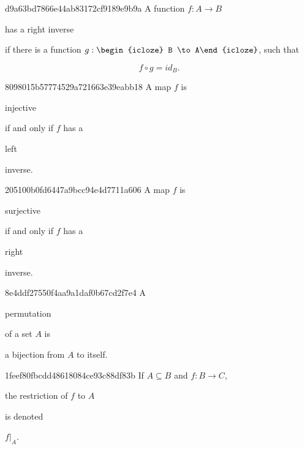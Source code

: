 \begin{note}{d9a63bd7866e44ab83172cf9189e9b9a}
    A function \({ f : A \to B }\) \begin{icloze}{3}has a right inverse\end{icloze} if there is a function \({ g : \begin{icloze}{2}B \to A\end{icloze} }\), such that
    \begin{icloze}{1}
        \[
            f \circ g = id_B.
        \]
    \end{icloze}
\end{note}

\begin{note}{8098015b57774529a721663e39eabb18}
    A map \({ f }\) is \begin{icloze}{1}injective\end{icloze} if and only if \({ f }\) has a \begin{icloze}{2}left\end{icloze} inverse.
\end{note}

\begin{note}{205100b0fd6447a9bcc94e4d7711a606}
    A map \({ f }\) is \begin{icloze}{1}surjective\end{icloze} if and only if \({ f }\) has a \begin{icloze}{2}right\end{icloze} inverse.
\end{note}

\begin{note}{8e4ddf27550f4aa9a1daf0b67cd2f7e4}
    A \begin{icloze}{2}permutation\end{icloze} of a set \({ A }\) is \begin{icloze}{1}a bijection from \({ A }\) to itself.\end{icloze}
\end{note}

\begin{note}{1feef80fbcdd48618084ce93c88df83b}
    If \({ A \subseteq B  }\) and \({ f : B \to C }\), \begin{icloze}{2}the restriction of \({ f }\) to \({ A }\)\end{icloze} is denoted \begin{icloze}{1}\({ f|_{A} }\).\end{icloze}
\end{note}

